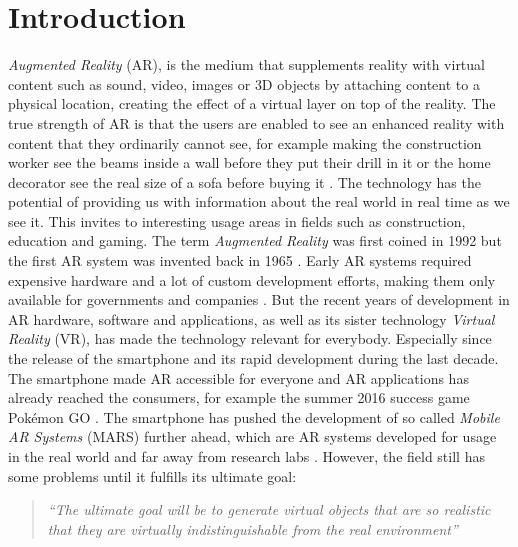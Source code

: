 \section{Introduction}
\textit{Augmented Reality} (AR), is the medium that supplements reality with virtual content such as sound, video, images or 3D objects \cite{azuma1997survey} by attaching content to a physical location, creating the effect of a virtual layer on top of the reality. The true strength of AR is that the users are enabled to see an enhanced reality with content that they ordinarily cannot see, for example making the construction worker see the beams inside a wall before they put their drill in it or the home decorator see the real size of a sofa before buying it \cite{venturebeatWalls, newatlasIkea}. The technology has the potential of providing us with information about the real world in real time as we see it. This invites to interesting usage areas in fields such as construction, education and gaming. 
The term \textit{Augmented Reality} was first coined in 1992 \cite{caudell1992augmented} but the first AR system was invented back in 1965 \cite{sutherland1968head}. Early AR systems required expensive hardware and a lot of custom development efforts, making them only available for governments and companies \cite{azuma2016most}. But the recent years of development in AR hardware, software and applications, as well as its sister technology \textit{Virtual Reality} (VR), has made the technology relevant for everybody. Especially since the release of the smartphone and its rapid development during the last decade. The smartphone made AR accessible for everyone and AR applications has already reached the consumers, for example the summer 2016 success game Pok\'emon GO \cite{azuma2016most}. The smartphone has pushed the development of so called \textit{Mobile AR Systems} (MARS) further ahead, which are AR systems developed for usage in the real world and far away from research labs \cite{hollerer2004mobile}. However, the field still has some problems until it fulfills its ultimate goal:
\begin{quote}
\textit{``The ultimate goal will be to generate virtual objects that are so realistic that they are virtually indistinguishable from the real environment''} \cite{azuma1997survey}
\end{quote} 

